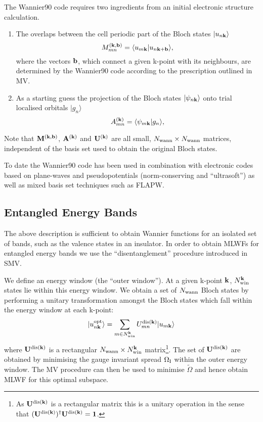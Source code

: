 The Wannier90 code requires two ingredients from an initial electronic structure calculation.
\begin{enumerate}
\item The overlaps between the cell periodic part of the Bloch states $|u_{n{\bf k}}\rangle$ 
\begin{equation}
M_{mn}^{(\bf{k,b})}=\langle u_{m{\bf k}}|u_{n{\bf k}+{\bf b}}\rangle,
\end{equation}
where the vectors ${\bf b}$, which connect a given k-point with its neighbours, are determined
by the Wannier90 code according to the prescription outlined in MV.
\item As a starting guess the projection of the Bloch states
  $|\psi_{n\bf{k}}\rangle$ onto trial localised orbitals $|g_{n}\rangle$ 
\begin{equation}
A_{mn}^{(\bf{k})}=\langle \psi_{m{\bf k}}|g_{n}\rangle,
\end{equation}
\end{enumerate}
Note that $\bf{M}^{(\bf{k,b})}$, $\bf{A}^{(\bf{k})}$ and
$\bf{U}^{({\bf k})}$ are all 
small, $N_{{\rm wann}}\times N_{{\rm wann}}$ matrices, independent of
the basis set used to obtain the original Bloch states.  

To date the Wannier90 code has been
used in combination with electronic codes based on plane-waves and
pseudopotentials (norm-conserving and ``ultrasoft'') as well as mixed
basis set techniques such as FLAPW. 

\subsection{Entangled Energy Bands}
The above description is sufficient to obtain Wannier functions for an
isolated set of bands, such as the valence states in an insulator. In
order to obtain MLWFs for entangled energy bands we use the
``disentanglement'' procedure introduced in SMV.

We define an energy window (the ``outer window''). At a given
k-point $\bf{k}$, 
$N^{{\bf k}}_{{\rm win}}$ states lie within this energy window. We
obtain a set of 
$N_{{\rm wann}}$ Bloch states by performing a unitary
transformation amongst the Bloch states which fall within the energy window at each k-point:
 \begin{equation}
| u_{n{\bf k}}^{{\rm opt}}\rangle = \sum_{m\in N^{{\bf k}}_{{\rm win}}}
U^{{\rm dis}({\bf k})}_{mn} | u_{m{\bf k}}\rangle
\end{equation}
where $\bf{U}^{{\rm dis}({\bf k})}$ is a rectangular $N_{{\rm
 wann}}\times N^{{\bf k}}_{{\rm win}}$
 matrix\footnote{As
    $\bf{U}^{{\rm dis}({\bf k})}$ is a rectangular matrix this is a unitary
    operation in the sense that $(\bf{U}^{{\rm dis}({\bf k})})^{\dagger}\bf{U}^{{\rm dis}({\bf k})}=\bf{1}$.}. The set of $\bf{U}^{{\rm dis}({\bf k})}$ are obtained by minimising
 the gauge invariant spread $\Omega_{{\rm I}}$ within the outer energy
 window. The MV procedure can then be used to minimise $\tilde{\Omega}$
 and hence obtain MLWF for this optimal subspace.

